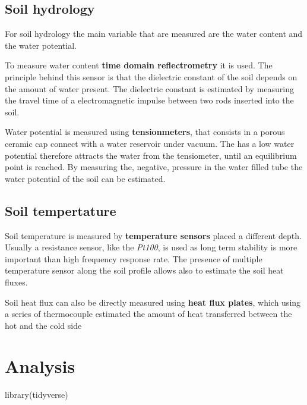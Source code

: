 \documentclass[
]{article}
\newenvironment{Shaded}{\begin{snugshade}}{\end{snugshade}}
\newcommand{\FunctionTok}[1]{\textcolor[rgb]{0.00,0.00,0.00}{#1}}
\newcommand{\NormalTok}[1]{#1}
\begin{document}
\hypertarget{soil-hydrology}{%
\subsection{Soil hydrology}\label{soil-hydrology}}

For soil hydrology the main variable that are measured are the water content and the water potential.

To measure water content \textbf{time domain reflectrometry} it is used.
The principle behind this sensor is that the dielectric constant of the soil depends on the amount of water present.
The dielectric constant is estimated by measuring the travel time of a electromagnetic impulse between two rods inserted into the soil.

Water potential is measured using \textbf{tensionmeters}, that consists in a porous ceramic cap connect with a water reservoir under vacuum.
The has a low water potential therefore attracts the water from the tensiometer, until an equilibrium point is reached. By measuring the, negative, pressure in the water filled tube the water potential of the soil can be estimated.

\hypertarget{soil-tempertature}{%
\subsection{Soil tempertature}\label{soil-tempertature}}

Soil temperature is measured by \textbf{temperature sensors} placed a different depth.
Usually a resistance sensor, like the \emph{Pt100}, is used as long term stability is more important than high frequency response rate.
The presence of multiple temperature sensor along the soil profile allows also to estimate the soil heat fluxes.

Soil heat flux can also be directly measured using \textbf{heat flux plates}, which using a series of thermocouple estimated the amount of heat transferred between the hot and the cold side

\newpage

\hypertarget{analysis}{%
\section{Analysis}\label{analysis}}

\begin{Shaded}
\begin{Highlighting}[]
\FunctionTok{library}\NormalTok{(tidyverse)}
\end{Highlighting}
\end{Shaded}
\end{document}
